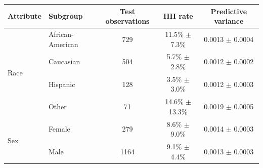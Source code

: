 \begin{tabular}{llccc}
\hline
Attribute & Subgroup & Test observations & HH rate & Predictive variance \\
\hline
\multirow{4}{*}{Race} & African-American & 729 & 11.5\% $\pm$ 7.3\% & 0.0013 $\pm$ 0.0004 \\
 & Caucasian & 504 & 5.7\% $\pm$ 2.8\% & 0.0012 $\pm$ 0.0002 \\
 & Hispanic & 128 & 3.5\% $\pm$ 3.0\% & 0.0012 $\pm$ 0.0003 \\
 & Other & 71 & 14.6\% $\pm$ 13.3\% & 0.0019 $\pm$ 0.0005 \\
\hline
\multirow{2}{*}{Sex} & Female & 279 & 8.6\% $\pm$ 9.0\% & 0.0014 $\pm$ 0.0003 \\
 & Male & 1164 & 9.1\% $\pm$ 4.4\% & 0.0013 $\pm$ 0.0003 \\
\hline
\end{tabular}